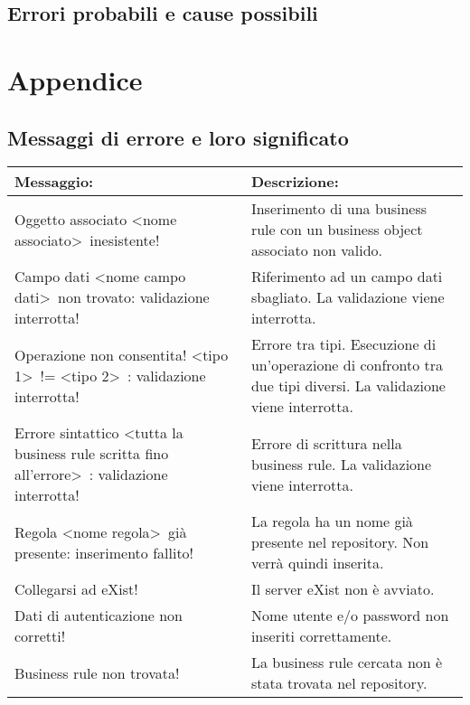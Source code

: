 \section{Errori probabili e cause possibili}
\chapter{Appendice}
\section{Messaggi di errore e loro significato}
\begin{table}[htbp]
\begin{tabular}{||p{6.5cm}||p{6.5cm}||}
\hline
\textbf{Messaggio:} & \textbf{Descrizione:} \\ \hline
Oggetto associato \textless nome associato\textgreater\ inesistente! & Inserimento di una business rule con un business object associato non valido. \\ \hline
Campo dati \textless nome campo dati\textgreater\ non trovato: validazione interrotta! & Riferimento ad un campo dati sbagliato. La validazione viene interrotta. \\ \hline
Operazione non consentita! \textless tipo 1\textgreater\ != \textless tipo 2\textgreater\ : validazione interrotta! & Errore tra tipi. Esecuzione di un'operazione di confronto tra due tipi diversi. La validazione viene interrotta. \\ \hline
Errore sintattico \textless tutta la business rule scritta fino all'errore\textgreater\ : validazione interrotta! & Errore di scrittura nella business rule. La validazione viene interrotta. \\ \hline
Regola \textless nome regola\textgreater\  gi\`a presente: inserimento fallito! & La regola ha un nome gi\`a presente nel repository. Non verr\`a quindi inserita. \\ \hline
Collegarsi ad eXist! & Il server eXist non \`e avviato. \\ \hline
Dati di autenticazione non corretti! & Nome utente e/o password non inseriti correttamente. \\ \hline
Business rule non trovata! & La business rule cercata non \`e stata trovata nel repository. \\ \hline
\end{tabular} \\
\end{table}



